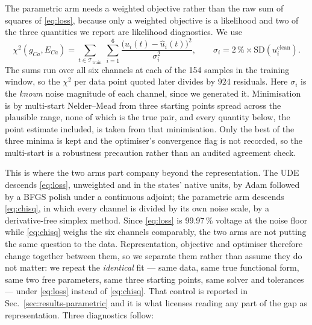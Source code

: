 \documentclass{article}
\newcommand{\Ttrain}{30}       %
\newcommand{\Ntrain}{154}      %
\newcommand{\Nchisq}{924}      %
\newcommand{\NoisePct}{2}      %
\newcommand{\LossShareV}{99.97}
\begin{document}
The parametric arm needs a weighted objective rather than the raw sum of squares
of \eqref{eq:loss}, because only a weighted objective is a likelihood and two of
the three quantities we report are likelihood diagnostics. We use
\begin{equation}
  \chi^2(g_{Ca}, E_{Ca})
    = \sum_{t\in\mathcal{T}_{\mathrm{train}}}\ \sum_{i=1}^{6}
      \frac{\bigl(u_i(t)-\hat u_i(t)\bigr)^2}{\sigma_i^2},
  \qquad
  \sigma_i = \NoisePct\,\%\times \mathrm{SD}(u_i^{\mathrm{clean}}).
  \label{eq:chisq}
\end{equation}
The sums run over all six channels at each of the \Ntrain{} samples in the
training window, so the $\chi^2$ per data point quoted later divides by
$\Nchisq$ residuals. Here $\sigma_i$ is the \emph{known} noise magnitude of each channel, since we
generated it. Minimisation is by multi-start Nelder--Mead from three starting
points spread across the plausible range, none of which is the true pair, and
every quantity below, the point estimate included, is taken from that
minimisation. Only the best of the three minima is kept and the optimiser's
convergence flag is not recorded, so the multi-start is a robustness precaution
rather than an audited agreement check.

This is where the two arms part company beyond the representation. The UDE
descends \eqref{eq:loss}, unweighted and in the states' native units, by Adam
followed by a BFGS polish under a continuous adjoint; the parametric arm
descends \eqref{eq:chisq}, in which every channel is divided by its own noise
scale, by a derivative-free simplex method. Since \eqref{eq:loss} is
\LossShareV\,\% voltage at the noise floor while \eqref{eq:chisq} weighs the six
channels comparably, the two arms are not putting the same question to the data.
Representation, objective and optimiser therefore change together between them,
so we separate them rather than assume they do not matter: we repeat the
\emph{identical} fit --- same data, same true functional form, same two free
parameters, same three starting points, same solver and tolerances --- under
\eqref{eq:loss} instead of \eqref{eq:chisq}. That control is reported in
Sec.~\ref{sec:results-parametric} and it is what licenses reading any part of the
gap as representation. Three diagnostics follow:
\end{document}
